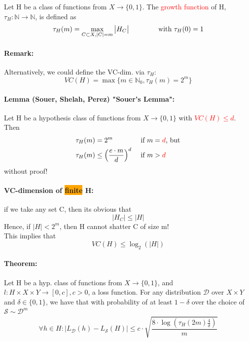 \documentclass[10pt,a4paper]{article}
\theoremstyle{definition}
\theoremstyle{plain}
\begin{document}
\begin{boxeddef}
	Let H be a class of functions from $X \to \{ 0,1 \}$. The \textcolor{red}{ growth function} of H, $\tau_H: \mathbb{N} \to \mathbb{N}$, is defined as 
	\begin{align*}		
		\tau_H (m) = \max_{C \subset X, |C| = m} \big|H_C\big| \hspace{1.5cm} \text{with } \tau_{H}(0)	= 1
	\end{align*}
\end{boxeddef}

\paragraph{Remark:} Alternatively, we could define the VC-dim. via $\tau_{H}$:
$$
	VC(H) = \max\{m\in\mathbb{N}_0, \tau_{H}(m) = 2^{m}\}
$$

\paragraph{Lemma (Souer, Shelah, Perez) "Souer's Lemma":} Let H be a hypothesis class of functions from $X \to \{ 0,1 \}$ with \textcolor{red}{$VC(H) \leq d$}. Then
\begin{align*}
	\tau_{H}(m) &= 2^{m} &&\text{ if } m = \text{\textcolor{red}{$d$}, but}\\
	\tau_{H}(m) &\leq \left(\frac{e\cdot m}{d}\right)^{d} &&\text{ if } m > \text{\textcolor{red}{$d$}}
\end{align*}
without proof!

\paragraph{VC-dimension of \colorbox{orange}{finite} H:} if we take any set C, then its obvious that 
$$ |H_C| \leq |H|$$
Hence, if $|H| < 2^m$, then H cannot shatter C of size m!\\
This implies that 
$$
	VC(H) \leq \log_2(|H|)
$$

\paragraph{Theorem:} Let H be a hyp. class of functions from $X \to \{ 0,1 \}$, and $l: H \times X \times Y \to [0, c], c > 0$, a loss function. For any distribution $\mathcal{D}$ over $X \times Y$ and $\delta \in \{ 0,1 \}$, we have that with probability of at least $1-\delta$ over the choice of $\mathcal{S} \sim \mathcal{D}^{m}$
$$
	\forall h \in H: \big| L_\mathcal{D}(h) - L_\mathcal{S}(H)  \big| \leq c \cdot \sqrt{\frac{8 \cdot \log\left(\tau_{H}(2m) \frac{4}{\delta}\right)}{m}}
$$
\end{document}
